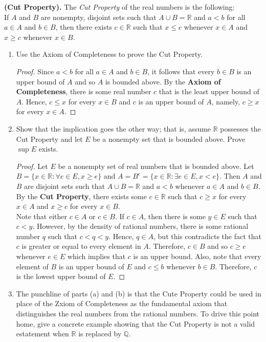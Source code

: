\documentclass[12pt]{article}
\newcommand{\R}{\mathbb{R}}
\newcommand{\Q}{\mathbb{Q}}
\newenvironment{problem}[2][Problem]{\begin{trivlist}
		\item[\hskip \labelsep {\bfseries #1}\hskip \labelsep {\bfseries #2.}]}{\end{trivlist}}
\begin{document}
		\begin{problem}{1.3.10}
			\textbf{(Cut Property).} The \textit{Cut Property} of the real numbers is the following:\\
			If $A$ and $B$ are nonempty, disjoint sets such that $A\cup B =\R$ and $a<b$ for all $a\in A$ and $b\in B$, then there exists $c\in \R$ such that $x\leq c$ whenever $x\in A$ and $x\geq c$ whenever $x\in B$.
			\begin{enumerate}[label=(\alph*)]
				\item Use the Axiom of Completeness to prove the Cut Property.
				\begin{proof}
					Since $a<b$ for all $a\in A$ and $b\in B$, it follows that every $b\in B$ is an upper bound of $A$ and so $A$ is bounded above. By the \textbf{Axiom of Completeness}, there is some real number $c$ that is the least upper bound of $A$. Hence, $c\leq x$ for every $x\in B$ and $c$ is an upper bound of $A$, namely,  $c\geq x$ for every $x\in A$.
				\end{proof}
				\item Show that the implication goes the other way; that is, assume $\R$ possesses the Cut Property and let $E$ be a nonempty set that is bounded above. Prove $\sup E$ exists.
				\begin{proof}
					Let $E$ be a nonempty set of real numbers that is bounded above. Let $B = \{x\in \R: \forall e\in E, x \geq e\}$ and $A=B^{c} = \{x\in \R:\exists e\in E, x < e \}$. Then $A$ and $B$ are disjoint sets such that $A\cup B = \R$ and $a<b$ whenever $a\in A$ and $b\in B$. By the \textbf{Cut Property}, there exists some $c\in \R$ such that $c\geq x$ for every $x\in A$ and $x\geq c$ for every $x\in B$. \\
					
					Note that either $c\in A$ or $c\in B$. If $c\in A$, then there is some $y\in E$ such that $c<y$. However, by the density of rational numbers, there is some rational number $q$ such that $c<q<y$. Hence, $q\in A$, but this contradicts the fact that $c$ is greater or equal to every element in $A$. Therefore, $c\in B$ and so $c\geq e$  whenever $e\in E$ which implies that $c$ is an upper bound. Also, note that every element of $B$ is an upper bound of $E$ and $c\leq b$ whenever $b\in B$. Therefore, $c$ is the lowest upper bound of $E$. 
				\end{proof}
				\item The punchline of parts (a) and (b) is that the Cute Property could be used in place of the Zxiom of Completeness as the fundamental axiom that distinguishes the real numbers from the rational numbers. To drive this point home, give a concrete example showing that the Cut Property is not a valid estatement when $\R$ is replaced by $\Q$.
			\end{enumerate}
		\end{problem}
	
\end{document}
